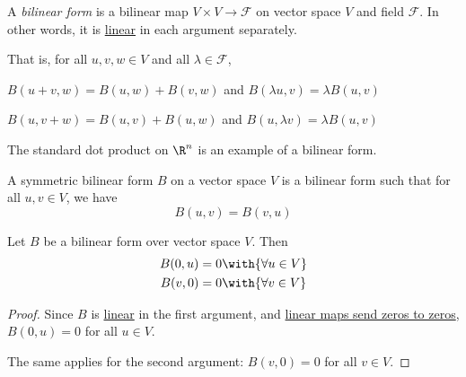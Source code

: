 \label{a4bba72}

A \textit{bilinear form} is a bilinear map $V\times V\to\mathcal F$ on vector
space $V$ and field $\mathcal F$. In other words, it is \href{d7d1925}{linear}
in each argument separately.

That is, for all $u,v,w\in V$ and all $\lambda\in\mathcal F$,
\begin{enumerati}
  \item $B(u+v,w)=B(u,w)+B(v,w)$ and $B(\lambda u,v)=\lambda B(u,v)$
  \item $B(u,v+w)=B(u,v)+B(u,w)$ and $B(u,\lambda v)=\lambda B(u,v)$
\end{enumerati}

The standard dot product on $\R^n$ is an example of a bilinear form.

\label{e17371e}

A symmetric bilinear form $B$ on a vector space $V$ is a bilinear form such
that for all $u,v\in V$, we have
$$
  B(u,v)=B(v,u)
$$

\label{b7a53dc}

Let $B$ be a bilinear form over vector space $V$. Then
\begin{align*}
  B(0,u) &=0\with{\forall u\in V} \\
  B(v,0) &=0\with{\forall v\in V}
\end{align*}

\begin{proof}
  Since $B$ is \href{d7d1925}{linear} in the first argument, and
  \href{c5eb127}{linear maps send zeros to zeros}, $B(0,u)=0$ for all $u\in V$.

  The same applies for the second argument: $B(v,0)=0$ for all $v\in V$.
\end{proof}
